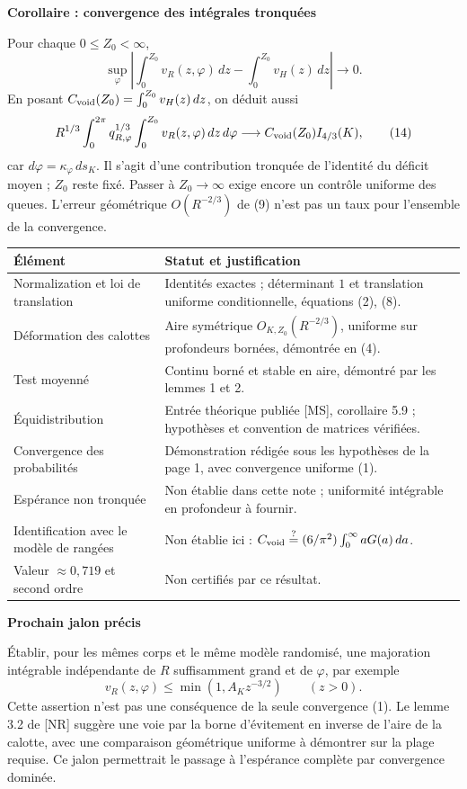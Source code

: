 \documentclass[11pt,a4paper]{article}
\newcommand{\head}[1]{\vspace{3pt}{\large\bfseries\color{navy}#1}\par}
\newcommand{\subhead}[1]{{\bfseries\color{navy}#1}\par}
\begin{document}
\subhead{Corollaire : convergence des intégrales tronquées}
Pour chaque $0\le Z_0<\infty$,
\[
 \sup_\varphi\left|\int_0^{Z_0}v_R(z,\varphi)\,dz
             -\int_0^{Z_0}v_H(z)\,dz\right|\longrightarrow0.
 \tag{13}
\]
En posant $C_{\rm void}(Z_0)=\int_0^{Z_0}v_H(z)\,dz$, on déduit aussi
\[
 R^{1/3}\int_0^{2\pi}q_{R,\varphi}^{1/3}
          \int_0^{Z_0}v_R(z,\varphi)\,dz\,d\varphi
 \longrightarrow C_{\rm void}(Z_0)I_{4/3}(K),
 \tag{14}
\]
car $d\varphi=\kappa_\varphi\,ds_K$. Il s'agit d'une contribution tronquée de l'identité du déficit moyen ; $Z_0$ reste fixé. Passer à $Z_0\to\infty$ exige encore un contrôle uniforme des queues. L'erreur géométrique $O(R^{-2/3})$ de (9) n'est pas un taux pour l'ensemble de la convergence.

\newpage
\head{6. Registre DYN-VALIDEX et jalon suivant}
\begin{tabularx}{\textwidth}{@{}p{}X@{}}
\toprule
Élément & Statut et justification\\
\midrule
Normalization et loi de translation & Identités exactes ; déterminant $1$ et translation uniforme conditionnelle, équations (2), (8).\\
Déformation des calottes & Aire symétrique $O_{K,Z_0}(R^{-2/3})$, uniforme sur profondeurs bornées, démontrée en (4).\\
Test moyenné & Continu borné et stable en aire, démontré par les lemmes 1 et 2.\\
Équidistribution & Entrée théorique publiée [MS], corollaire 5.9 ; hypothèses et convention de matrices vérifiées.\\
Convergence des probabilités & Démonstration rédigée sous les hypothèses de la page 1, avec convergence uniforme (1).\\
Espérance non tronquée & Non établie dans cette note ; uniformité intégrable en profondeur à fournir.\\
Identification avec le modèle de rangées & Non établie ici : $C_{\rm void}\stackrel{?}{=}(6/\pi^2)\int_0^\infty aG(a)\,da$.\\
Valeur $\approx0,719$ et second ordre & Non certifiés par ce résultat.\\
\bottomrule
\end{tabularx}

\subhead{Prochain jalon précis}
Établir, pour les mêmes corps et le même modèle randomisé, une majoration intégrable indépendante de $R$ suffisamment grand et de $\varphi$, par exemple
\[
 v_R(z,\varphi)\le\min(1,A_K z^{-3/2})\qquad(z>0).
\]
Cette assertion n'est pas une conséquence de la seule convergence (1). Le lemme 3.2 de [NR] suggère une voie par la borne d'évitement en inverse de l'aire de la calotte, avec une comparaison géométrique uniforme à démontrer sur la plage requise. Ce jalon permettrait le passage à l'espérance complète par convergence dominée.
\end{document}
